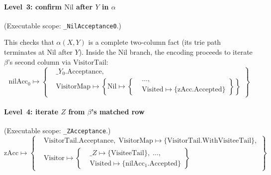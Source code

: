 \paragraph{Level~3: confirm $\mathrm{Nil}$ after $Y$ in $\alpha$}

(Executable scope: \texttt{\_NilAcceptance0}.)

This checks that $\alpha(X, Y)$ is a complete two-column
fact (its trie path terminates at $\mathrm{Nil}$ after $Y$).
Inside the $\mathrm{Nil}$ branch, the encoding proceeds to
iterate $\beta$'s second column via $\mathrm{VisitorTail}$:
{\small
  \[
    \mathrm{nilAcc}_0 \mapsto \left\{
      \begin{aligned}
        &\_Y_0.\mathrm{Acceptance},\\
        &\mathrm{VisitorMap} \mapsto \left\{\mathrm{Nil} \mapsto \left\{
            \begin{aligned}
              &\ldots,\\
              &\mathrm{Visited} \mapsto \{\mathrm{zAcc}.\mathrm{Accepted}\}
        \end{aligned}\right\}\right\}
    \end{aligned}\right\}
\]}

\paragraph{Level~4: iterate $Z$ from $\beta$'s matched row}
(Executable scope: \texttt{\_ZAcceptance}.)
{\small
  \[
    \mathrm{zAcc} \mapsto \left\{
      \begin{aligned}
        &\mathrm{VisitorTail}.\mathrm{Acceptance},\; \mathrm{VisitorMap} \mapsto \{\mathrm{VisitorTail}.\mathrm{WithVisiteeTail}\},\\
        &\mathrm{Visitor} \mapsto \left\{
          \begin{aligned}
            &\_Z \mapsto \{\mathrm{VisiteeTail}\},\; \ldots,\\
            &\mathrm{Visited} \mapsto \{\mathrm{nilAcc}_1.\mathrm{Accepted}\}
        \end{aligned}\right\}
    \end{aligned}\right\}
\]}

